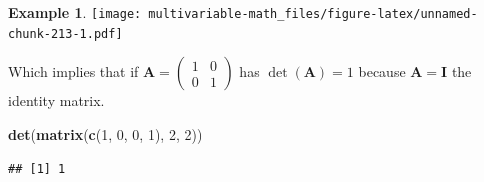 \documentclass[
]{book}
\newenvironment{Shaded}{\begin{snugshade}}{\end{snugshade}}
\newcommand{\DecValTok}[1]{\textcolor[rgb]{0.00,0.00,0.81}{#1}}
\newcommand{\KeywordTok}[1]{\textcolor[rgb]{0.13,0.29,0.53}{\textbf{#1}}}
\newcommand{\NormalTok}[1]{#1}
\theoremstyle{definition}
\theoremstyle{definition}
\newtheorem{example}{Example}[chapter]
\theoremstyle{definition}
\theoremstyle{remark}
\begin{document}
\begin{example}
\texttt{[image: multivariable-math\_files/figure-latex/unnamed-chunk-213-1.pdf]}

Which implies that if \(\mathbf{A} = \begin{pmatrix} 1 & 0 \\ 0 & 1 \end{pmatrix}\) has \(\det(\mathbf{A}) = 1\) because \(\mathbf{A} = \mathbf{I}\) the identity matrix.

\begin{Shaded}
\begin{Highlighting}[]
\KeywordTok{det}\NormalTok{(}\KeywordTok{matrix}\NormalTok{(}\KeywordTok{c}\NormalTok{(}\DecValTok{1}\NormalTok{, }\DecValTok{0}\NormalTok{, }\DecValTok{0}\NormalTok{, }\DecValTok{1}\NormalTok{), }\DecValTok{2}\NormalTok{, }\DecValTok{2}\NormalTok{))}
\end{Highlighting}
\end{Shaded}

\begin{verbatim}
## [1] 1
\end{verbatim}

\end{example}
\end{document}
